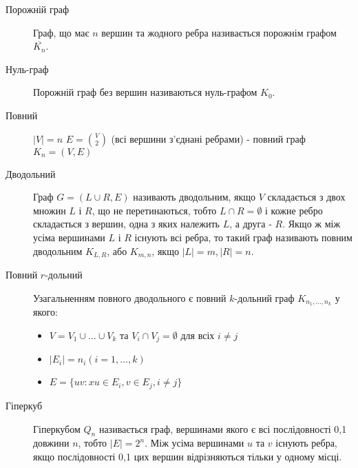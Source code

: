 \begin{description}
        \item[Порожній граф] Граф, що має $n$ вершин та жодного ребра називається порожнім графом $\overline{K_n}$.
        \item[Нуль-граф] Порожній граф без вершин називаються нуль-графом $K_0$.
        \item[Повний] $\vert V \vert = n$ $E = {V \choose 2}$ (всі вершини з'єднані ребрами) - повний граф $K_n = (V,E)$
        \item[Дводольний] Граф $G = (L \cup R,E)$ називають дводольним, якщо $V$ складається з двох множин $L$ і $R$, що не перетинаються, тобто $L \cap R = \emptyset$ і кожне ребро складається з вершин, одна з яких належить $L$, а друга - $R$. Якщо ж між усіма вершинами $L$ і $R$ існують всі ребра, то такий граф називають повним дводольним $K_{L,R}$, або $K_{m,n}$, якщо $\vert L \vert = m, \vert R \vert = n$.
        \item[Повний $r$-дольний] Узагальненням повного дводольного є повний $k$-дольний граф $K_{n_1,\dots,n_k}$ у якого:
        \begin{itemize}     
        \item $V=V_1 \cup \dots \cup V_k$ та $V_i \cap V_j = \emptyset$ для всіх $i \ne j$
        \item $\vert E_i \vert = n_i (i=1,\dots,k)$
        \item $E = \lbrace uv : xu \in E_i, v \in E_j, i \ne j \rbrace$
        \end{itemize}
        \item[Гіперкуб] Гіперкубом $Q_n$ називається граф, вершинами якого є всі послідовності 0,1 довжини $n$, тобто $\vert E \vert = 2^n$. Між усіма вершинами $u$ та $v$ існують ребра, якщо послідовності 0,1 цих вершин відрізняються тільки у одному місці.
\end{description}

